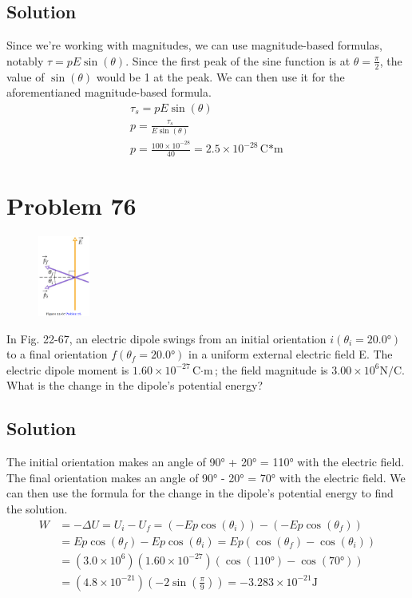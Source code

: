 \documentclass[12pt]{article}
\begin{document}
\subsection*{Solution}
Since we're working with magnitudes, we can use magnitude-based formulas, notably \(\tau = pE\sin(\theta)\). 
Since the first peak of the sine function is at $\theta = \frac{\pi}{2}$, the value of $\sin(\theta)$ would be 1 at the peak. 
We can then use it for the aforementianed magnitude-based formula.
\begin{gather*}
    \tau_s  =   pE\sin(\theta)\\
    p   =   \frac{\tau_s}{E\sin(\theta)}\\
    p   =   \frac{100 \times 10^{-28}}{40}
        =   \boxed{2.5 \times 10^{-28} \unit{\coulomb*\meter}}
\end{gather*}

\pagebreak
\section{Problem 76}
\begin{figure}
    \vspace{-30pt}
    \includegraphics[width=0.15\textwidth]{picture_6.png} 
\end{figure}
In Fig. 22-67, an electric dipole swings from an initial orientation $i (\theta_i = 20.0\unit{\degree})$ to a final orientation $f (\theta_f= 20.0\unit{\degree})$ in a uniform external electric field E. The electric dipole moment is $1.60 \times 10^{-27} \unit{\coulomb\cdot\meter}$; the field magnitude is $3.00 \times 10^6 \unit{\newton/\coulomb}$. What is the change in the dipole's potential energy?

\subsection*{Solution}
The initial orientation makes an angle of 90\unit{\degree} + 20\unit{\degree} = 110\unit{\degree} with the electric field.
The final orientation makes an angle of 90\unit{\degree} - 20\unit{\degree} = 70\unit{\degree} with the electric field.
We can then use the formula for the change in the dipole's potential energy to find the solution.
\begin{align*}
    W   &=  -\Delta U
        =   U_i - U_f
        =   (-Ep\cos(\theta_i)) - (-Ep\cos(\theta_f))\\
        &=  Ep\cos(\theta_f) - Ep\cos(\theta_i)
        =   Ep(\cos(\theta_f) - \cos(\theta_i))\\
        &=  (3.0 \times 10^6)(1.60 \times 10^{-27})(\cos(110\unit{\degree}) - \cos(70\unit{\degree}))\\
        &=  \left(4.8 \times 10^{-21}\right)\left(-2\sin\left(\frac{\pi}{9}\right)\right)
        =   \boxed{-3.283 \times 10^{-21} \unit{\joule}}
\end{align*}
\end{document}
